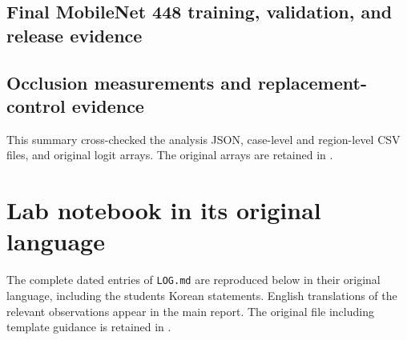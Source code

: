 \documentclass[11pt]{article}
\begin{document}
\clearpage
\subsection*{Final MobileNet 448 training, validation, and release evidence}

\clearpage
\subsection*{Occlusion measurements and replacement-control evidence}
This summary cross-checked the analysis JSON, case-level and region-level
CSV files, and original logit arrays. The original arrays are retained in
.

\clearpage
\section{Lab notebook in its original language}

The complete dated entries of \texttt{LOG.md} are reproduced below in their
original language, including the student\textquotesingle{}s Korean statements. English
translations of the relevant observations appear in the main report.
The original file including template guidance is retained in
.
\end{document}
